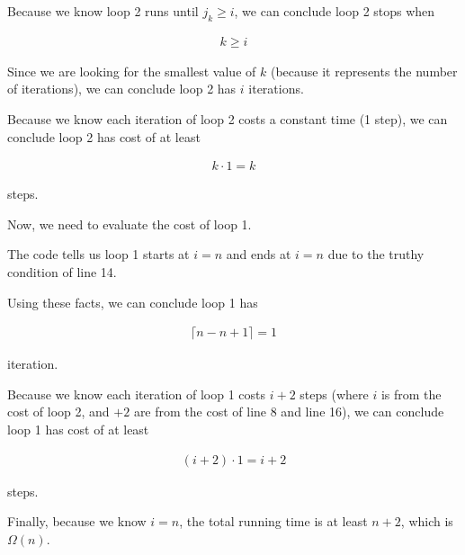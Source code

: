 \documentclass[12pt]{article}
\begin{document}
\begin{enumerate}[a.]
\begin{mdframed}
        \bigskip

        Because we know loop 2 runs until $j_k \geq i$, we can conclude loop 2 stops when

        \setcounter{equation}{0}
        \begin{align}
            k \geq i
        \end{align}

        \bigskip

        Since we are looking for the smallest value of $k$ (because it represents the
        number of iterations), we can conclude loop 2 has $i$ iterations.

        \bigskip

        Because we know each iteration of loop 2 costs a constant time (1 step), we
        can conclude loop 2 has cost of at least

        \begin{align}
            k \cdot 1 = k
        \end{align}

        steps.

        \bigskip

        Now, we need to evaluate the cost of loop 1.

        \bigskip

        The code tells us loop 1 starts at $i = n$ and ends at $i = n$ due to the truthy
        condition of line 14.

        \bigskip

        Using these facts, we can conclude loop 1 has

        \begin{align}
            \lceil n -n + 1 \rceil = 1
        \end{align}

        iteration.

        \bigskip

        Because we know each iteration of loop 1 costs $i + 2$ steps (where $i$ is
        from the cost of loop 2, and $+2$ are from the cost of line 8 and line 16),
        we can conclude loop 1 has cost of at least

        \begin{align}
            (i + 2) \cdot 1 = i + 2
        \end{align}

        steps.

        \bigskip

        Finally, because we know $i = n$, the total running time is at least $n + 2$,
        which is $\Omega(n)$.


\end{mdframed}
\end{enumerate}
\end{document}
